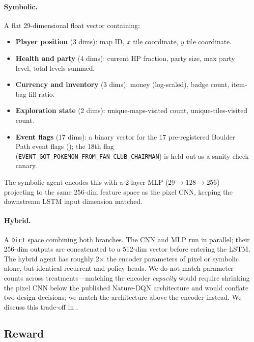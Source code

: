 \paragraph{Symbolic.}
A flat 29-dimensional float vector containing:
%
\begin{itemize}
\item \textbf{Player position} (3 dims): map ID, $x$ tile coordinate,
  $y$ tile coordinate.
\item \textbf{Health and party} (4 dims): current HP fraction, party
  size, max party level, total levels summed.
\item \textbf{Currency and inventory} (3 dims): money (log-scaled),
  badge count, item-bag fill ratio.
\item \textbf{Exploration state} (2 dims): unique-maps-visited count,
  unique-tiles-visited count.
\item \textbf{Event flags} (17 dims): a binary vector for the 17
  pre-registered Boulder Path event flags (); the
  18th flag (\texttt{EVENT\_GOT\_POKEMON\_FROM\_FAN\_CLUB\_CHAIRMAN})
  is held out as a sanity-check canary.
\end{itemize}
%
The symbolic agent encodes this with a 2-layer MLP ($29 \to 128 \to
256$) projecting to the same 256-dim feature space as the pixel CNN,
keeping the downstream LSTM input dimension matched.

\paragraph{Hybrid.}
A \texttt{Dict} space combining both branches.  The CNN and MLP run in
parallel; their 256-dim outputs are concatenated to a 512-dim vector
before entering the LSTM.  The hybrid agent has roughly 2$\times$ the
encoder parameters of pixel or symbolic alone, but identical
recurrent and policy heads.  We do not match parameter counts across
treatments---matching the encoder \emph{capacity} would require
shrinking the pixel CNN below the published Nature-DQN architecture
and would conflate two design decisions; we match the architecture
above the encoder instead.  We discuss this trade-off in
.

\subsection{Reward}
\label{sec:reward}

